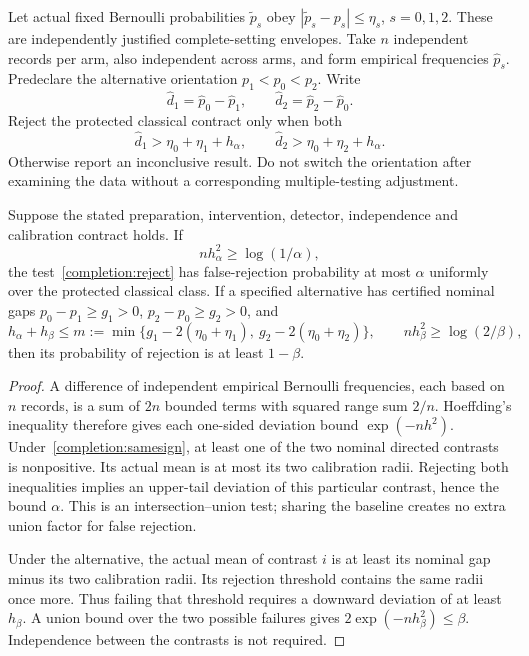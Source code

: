 Let actual fixed Bernoulli probabilities $\widetilde p_s$ obey
$|\widetilde p_s-p_s|\leq\eta_s$, $s=0,1,2$. These are independently
justified complete-setting envelopes. Take $n$ independent records per arm,
also independent across arms, and form empirical frequencies $\widehat p_s$.
Predeclare the alternative orientation $p_1<p_0<p_2$. Write
\[
 \widehat d_1=\widehat p_0-\widehat p_1,
 \qquad\widehat d_2=\widehat p_2-\widehat p_0.
\]
Reject the protected classical contract only when both
\begin{equation}\label{completion:reject}
 \widehat d_1>\eta_0+\eta_1+h_\alpha,
 \qquad
 \widehat d_2>\eta_0+\eta_2+h_\alpha.
\end{equation}
Otherwise report an inconclusive result. Do not switch the orientation after
examining the data without a corresponding multiple-testing adjustment.

\begin{theorem}
Suppose the stated preparation, intervention, detector, independence and
calibration contract holds. If
\[
 n h_\alpha^2\geq\log(1/\alpha),
\]
the test~\eqref{completion:reject} has false-rejection probability at most
$\alpha$ uniformly over the protected classical class.
If a specified alternative has certified nominal gaps
$p_0-p_1\geq g_1>0$, $p_2-p_0\geq g_2>0$, and
\[
 h_\alpha+h_\beta\leq
 m:=\min\{g_1-2(\eta_0+\eta_1),\ g_2-2(\eta_0+\eta_2)\},
 \qquad n h_\beta^2\geq\log(2/\beta),
\]
then its probability of rejection is at least $1-\beta$.
\end{theorem}
\begin{proof}
A difference of independent empirical Bernoulli frequencies, each based on
$n$ records, is a sum of $2n$ bounded terms with squared range sum $2/n$.
Hoeffding's inequality therefore gives each one-sided deviation bound
$\exp(-nh^2)$. Under~\eqref{completion:samesign}, at least one of the two
nominal directed contrasts is nonpositive. Its actual mean is at most its
two calibration radii. Rejecting both inequalities implies an upper-tail
deviation of this particular contrast, hence the bound $\alpha$. This is an
intersection--union test; sharing the baseline creates no extra union factor
for false rejection.

Under the alternative, the actual mean of contrast $i$ is at least its
nominal gap minus its two calibration radii. Its rejection threshold contains
the same radii once more. Thus failing that threshold requires a downward
deviation of at least $h_\beta$. A union bound over the two possible failures
gives $2\exp(-nh_\beta^2)\leq\beta$. Independence between the contrasts
is not required.
\end{proof}

